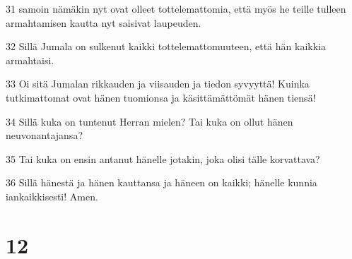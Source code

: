 \par 31 samoin nämäkin nyt ovat olleet tottelemattomia, että myös he teille tulleen armahtamisen kautta nyt saisivat laupeuden.
\par 32 Sillä Jumala on sulkenut kaikki tottelemattomuuteen, että hän kaikkia armahtaisi.
\par 33 Oi sitä Jumalan rikkauden ja viisauden ja tiedon syvyyttä! Kuinka tutkimattomat ovat hänen tuomionsa ja käsittämättömät hänen tiensä!
\par 34 Sillä kuka on tuntenut Herran mielen? Tai kuka on ollut hänen neuvonantajansa?
\par 35 Tai kuka on ensin antanut hänelle jotakin, joka olisi tälle korvattava?
\par 36 Sillä hänestä ja hänen kauttansa ja häneen on kaikki; hänelle kunnia iankaikkisesti! Amen.

\chapter{12}


